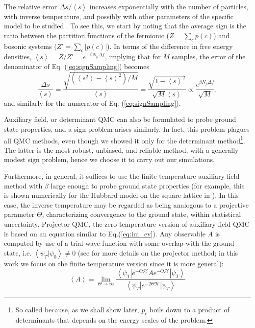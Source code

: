 The relative error $\Delta s / \left\langle s \right\rangle$ increases exponentially with the number of particles, with inverse temperature, and possibly with other parameters of the specific model to be studied \cite{troyer_computational_2005, hou_numerical_2009}.
To see this, we start by noting that the average sign is the ratio between the partition functions of the fermionic ($Z = \sum_c p(c)$) and bosonic systems ($Z' = \sum_c | p ( c ) |$).
In terms of the difference in free energy densities, $\left\langle s \right\rangle = Z / Z' = e^{-\beta N_p \Delta f}$, implying that for $M$ samples, the error of the denominator of Eq. (\ref{eq:signSampling}) becomes
\begin{equation}
\frac{\Delta s}{\left\langle s \right\rangle} = \frac{\sqrt{(\left\langle s^2 \right\rangle - \left\langle s \right\rangle^2 )/ M }}{\left\langle s \right\rangle} = \frac{ \sqrt{ 1 - \left\langle s \right\rangle^2}  }{\sqrt{M} \left\langle s \right\rangle} \propto \frac{e^{\beta N_p \Delta f}}{\sqrt{M}} ,
\end{equation}
and similarly for the numerator of Eq. (\ref{eq:signSampling}).

Auxiliary field, or determinant \acs{QMC} can also be formulated to probe ground state properties, and a sign problem arises similarly.
In fact, this problem plagues all \acs{QMC} methods, even though we showed it only for the determinant method\footnote{So called because, as we shall show later, $p_c$ boils down to a product of determinants that depends on the energy scales of the problem.}.
The latter is the most robust, unbiased, and reliable method, with a generally modest sign problem, hence we choose it to carry out our simulations.

Furthermore, in general, it suffices to use the finite temperature auxiliary field  method with $\beta$ large enough to probe ground state properties (for example, this is shown numerically for the Hubbard model on the square lattice in \cite{white_numerical_1989}).
In this case, the inverse temperature may be regarded as being analogous to a  projective parameter $\Theta$, characterizing convergence to the ground state, within statistical uncertainty.
Projector \ac{QMC}, the zero temperature version of auxiliary field \ac{QMC} is based on an equation similar to Eq.(\ref{eq:im_ev}).
Any observable $A$ is computed by use of a trial wave function with some overlap with the ground state, i.e. $\left\langle \psi_T | \psi_0 \right\rangle \neq 0$ (see \cite{f._assaad_quantum_2002} for more details on the projector method; in this work we focus on the finite temperature version since it is more general):
\begin{equation}
\left\langle A \right\rangle = \lim_{\Theta \rightarrow \infty} \frac{\left\langle \psi_T | e^{-\Theta \mathcal{H} } A e^{-\Theta \mathcal{H} } | \psi_T \right\rangle }{\left\langle \psi_T | e^{- 2 \Theta \mathcal{H} } | \psi_T \right\rangle}
\end{equation}

